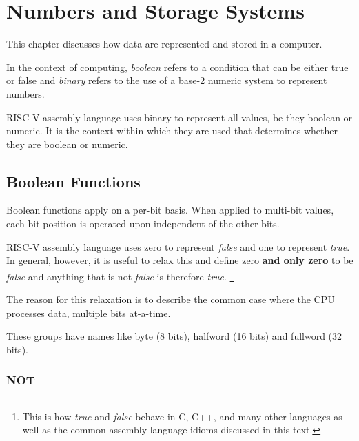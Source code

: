 \chapter{Numbers and Storage Systems}
\label{chapter:numbers}

This chapter discusses how data are represented and stored in a computer.

In the context of computing, {\em boolean} refers to a condition that can 
be either true or false and {\em binary} refers to the use of a base-2 
numeric system to represent numbers.

RISC-V assembly language uses binary to represent all values, be they 
boolean or numeric.  It is the context within which they are used that
determines whether they are boolean or numeric.


\section{Boolean Functions}

Boolean functions apply on a per-bit basis.
When applied to multi-bit values, each bit position is operated upon 
independent of the other bits.

RISC-V assembly language uses zero to represent {\em false} and one 
to represent {\em true}.  In general, however, it is useful to relax 
this and define zero {\bf and only zero} to be {\em false} and anything 
that is not {\em false} is therefore {\em true}.%
\footnote{This is how {\em true} and {\em false} behave in C, C++, and
many other languages as well as the common assembly language idioms
discussed in this text.}

The reason for this relaxation is to describe the common case 
where the CPU processes data, multiple \gls{bit}s at-a-time.

These
groups have names like \gls{byte} (8 bits), \gls{halfword} (16 bits) 
and \gls{fullword} (32 bits).

\subsection{NOT}

